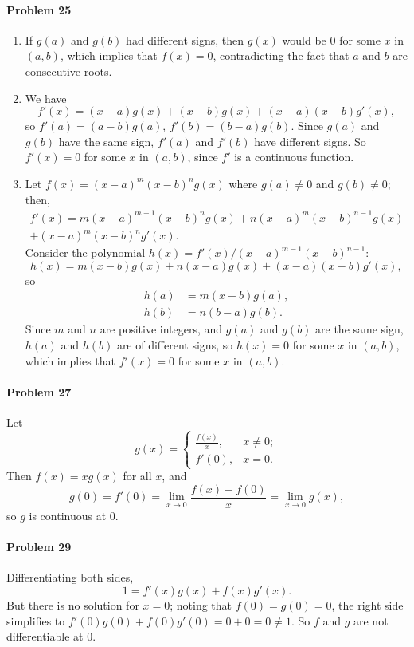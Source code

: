 \documentclass{article}
\begin{document}
\paragraph{Problem 25}
\begin{enumerate}
  \item If $g(a)$ and $g(b)$ had different signs, then $g(x)$ would be 0 for
    some $x$ in $(a, b)$, which implies that $f(x) = 0$, contradicting the fact
    that $a$ and $b$ are consecutive roots.
  \item We have \[
      f'(x) = (x - a)g(x) + (x - b)g(x) + (x - a)(x - b)g'(x),
    \] so $f'(a) = (a - b)g(a)$, $f'(b) = (b - a)g(b)$. Since $g(a)$ and $g(b)$
    have the same sign, $f'(a)$ and $f'(b)$ have different signs. So $f'(x) =
    0$ for some $x$ in $(a, b)$, since $f'$ is a continuous function.
  \item Let $f(x) = (x - a)^m(x - b)^ng(x)$ where $g(a) \neq 0$ and $g(b) \neq
    0$; then,
    \begin{multline*}
      f'(x) = m(x - a)^{m - 1}(x - b)^ng(x) + n(x - a)^m(x - b)^{n - 1}g(x) \\
      + (x - a)^m(x - b)^ng'(x).
    \end{multline*}
    Consider the polynomial $h(x) = f'(x)/(x - a)^{m - 1}(x - b)^{n - 1}$: \[
      h(x) = m(x - b)g(x) + n(x - a)g(x) + (x - a)(x - b)g'(x),
    \] so
    \begin{align*}
      h(a) &= m(x - b)g(a), \\
      h(b) &= n(b - a)g(b).
    \end{align*}
    Since $m$ and $n$ are positive integers, and $g(a)$ and $g(b)$ are the same
    sign, $h(a)$ and $h(b)$ are of different signs, so $h(x) = 0$ for some $x$
    in $(a, b)$, which implies that $f'(x) = 0$ for some $x$ in $(a, b)$.
\end{enumerate}

\paragraph{Problem 27} Let \[
  g(x) =
  \begin{cases}
    \frac{f(x)}{x}, &x \neq 0; \\
    f'(0), &x = 0.
  \end{cases}
  \] Then $f(x) = xg(x)$ for all $x$, and \[
  g(0) = f'(0) = \lim_{x \to 0} \frac{f(x) - f(0)}{x} = \lim_{x \to 0} g(x),
\] so $g$ is continuous at 0.

\paragraph{Problem 29} Differentiating both sides, \[
  1 = f'(x)g(x) + f(x)g'(x).
\] But there is no solution for $x = 0$; noting that $f(0) = g(0) = 0$, the
right side simplifies to $f'(0)g(0) + f(0)g'(0) = 0 + 0 = 0 \neq 1$. So $f$ and
$g$ are not differentiable at 0.
\end{document}
